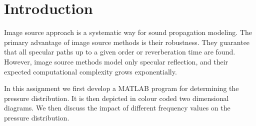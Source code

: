  \chapter*{Introduction}

\noindent Image source approach is a systematic way for sound propagation modeling. The primary advantage of image source methods is their robustness. They guarantee that all specular paths up to a given order or reverberation time are found. However, image source methods model only specular reflection, and their expected computational complexity grows exponentially.

\noindent In this assignment we first develop a MATLAB program for determining the pressure distribution. It is then depicted in colour coded two dimensional diagrams. We then discuss the impact of different frequency values on the pressure distribution.



